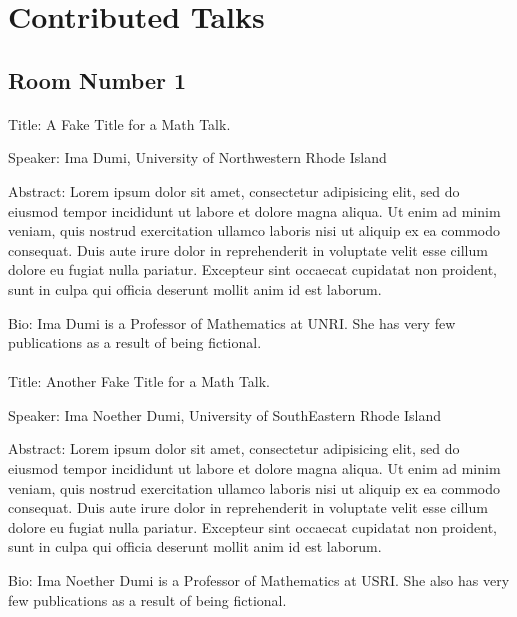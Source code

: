 \documentclass[10pt,]{article}
\theoremstyle{plain}
\begin{document}
\section[{Contributed Talks}]{Contributed Talks}\label{section-4}
\typeout{************************************************}
\typeout{************************************************}
\subsection[{Room Number 1}]{Room Number 1}\label{subsection-1}
\typeout{************************************************}
\typeout{************************************************}
\paragraph[{}]{}\hypertarget{paragraphs-3}{}
\hypertarget{p-10}{}%
Title: A Fake Title for a Math Talk.%
\par
\hypertarget{p-11}{}%
Speaker: Ima Dumi, University of Northwestern Rhode Island%
\par
\hypertarget{p-12}{}%
Abstract: Lorem ipsum dolor sit amet, consectetur adipisicing elit, sed do eiusmod tempor incididunt ut labore et dolore magna aliqua. Ut enim ad minim veniam, quis nostrud exercitation ullamco laboris nisi ut aliquip ex ea commodo consequat. Duis aute irure dolor in reprehenderit in voluptate velit esse cillum dolore eu fugiat nulla pariatur. Excepteur sint occaecat cupidatat non proident, sunt in culpa qui officia deserunt mollit anim id est laborum.%
\par
\hypertarget{p-13}{}%
Bio: Ima Dumi is a Professor of Mathematics at UNRI.  She has very few publications as a result of being fictional.%
\typeout{************************************************}
\typeout{************************************************}
\paragraph[{}]{}\hypertarget{paragraphs-4}{}
\hypertarget{p-14}{}%
Title: Another Fake Title for a Math Talk.%
\par
\hypertarget{p-15}{}%
Speaker: Ima Noether Dumi, University of SouthEastern Rhode Island%
\par
\hypertarget{p-16}{}%
Abstract: Lorem ipsum dolor sit amet, consectetur adipisicing elit, sed do eiusmod tempor incididunt ut labore et dolore magna aliqua. Ut enim ad minim veniam, quis nostrud exercitation ullamco laboris nisi ut aliquip ex ea commodo consequat. Duis aute irure dolor in reprehenderit in voluptate velit esse cillum dolore eu fugiat nulla pariatur. Excepteur sint occaecat cupidatat non proident, sunt in culpa qui officia deserunt mollit anim id est laborum.%
\par
\hypertarget{p-17}{}%
Bio: Ima Noether Dumi is a Professor of Mathematics at USRI.  She also has very few publications as a result of being fictional.%
\typeout{************************************************}
\typeout{************************************************}
\end{document}
